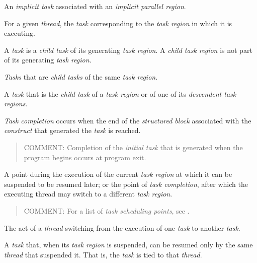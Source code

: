 \glossarydefstart
An \emph{implicit task} associated with an \emph{implicit parallel region}.
\glossarydefend

\glossarydefstart
For a given \emph{thread}, the \emph{task} corresponding to the \emph{task region} in which it is 
executing.
\glossarydefend

\glossarydefstart
A \emph{task} is a \emph{child task} of its generating \emph{task region}. 
A \emph{child task region} is not part of its generating \emph{task region}.
\glossarydefend

\glossarydefstart
\emph{Tasks} that are \emph{child tasks} of the same \emph{task region}.
\glossarydefend

\glossarydefstart
A \emph{task} that is the \emph{child task} of a \emph{task region} or of one of its 
\emph{descendent task regions}.
\glossarydefend

\glossarydefstart
\emph{Task completion} occurs when the end of the \emph{structured block} associated with the 
\emph{construct} that generated the \emph{task} is reached.

\begin{quote}
COMMENT: Completion of the \emph{initial task} that is generated when the program begins occurs at program exit.
\end{quote}
\glossarydefend

\glossarydefstart
A point during the execution of the current \emph{task region} at which it can be 
suspended to be resumed later; or the point of \emph{task completion}, after which the 
executing thread may switch to a different \emph{task region}. 

\begin{quote}
COMMENT: For a list of \emph{task scheduling points}, see .
\end{quote}
\glossarydefend

\glossarydefstart
The act of a \emph{thread} switching from the execution of one \emph{task} to another \emph{task}.
\glossarydefend

\glossarydefstart
A \emph{task} that, when its \emph{task region} is suspended, can be resumed only by the same 
\emph{thread} that suspended it. That is, the \emph{task} is tied to that \emph{thread}. 
\glossarydefend

